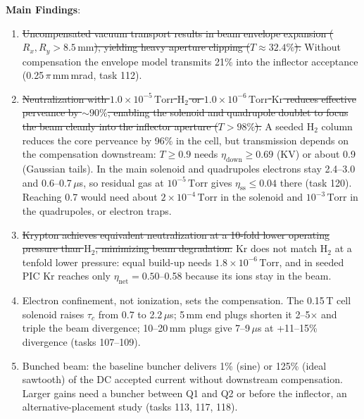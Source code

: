 \documentclass[11pt,a4paper]{article}
\newcommand{\old}[1]{\textcolor{red!70!black}{\sout{#1}}}
\newcommand{\new}[1]{\textcolor{blue!60!black}{#1}}
\begin{document}
\textbf{Main Findings}:
\begin{enumerate}
    \item \old{Uncompensated vacuum transport results in beam envelope expansion ($R_x, R_y > 8.5\,\text{mm}$), yielding heavy aperture clipping ($T \approx 32.4\%$).} \new{Without compensation the envelope model transmits 21\% into the inflector acceptance (0.25\,$\pi$\,mm\,mrad, task 112).}
    \item \old{Neutralization with $1.0 \times 10^{-5}\,\text{Torr}$ $\text{H}_2$ or $1.0 \times 10^{-6}\,\text{Torr}$ $\text{Kr}$ reduces effective perveance by $\sim 90\%$, enabling the solenoid and quadrupole doublet to focus the beam cleanly into the inflector aperture ($T > 98\%$).} \new{A seeded $\text{H}_2$ column reduces the core perveance by 96\% in the cell, but transmission depends on the compensation downstream: $T \ge 0.9$ needs $\eta_{\text{down}} \ge 0.69$ (KV) or about 0.9 (Gaussian tails). In the main solenoid and quadrupoles electrons stay 2.4--3.0 and 0.6--0.7\,$\mu$s, so residual gas at $10^{-5}\,\text{Torr}$ gives $\eta_{\text{ss}} \le 0.04$ there (task 120). Reaching 0.7 would need about $2\times10^{-4}\,\text{Torr}$ in the solenoid and $10^{-3}\,\text{Torr}$ in the quadrupoles, or electron traps.}
    \item \old{Krypton achieves equivalent neutralization at a 10-fold lower operating pressure than $\text{H}_2$, minimizing beam degradation.} \new{Kr does not match $\text{H}_2$ at a tenfold lower pressure: equal build-up needs $1.8\times10^{-6}\,\text{Torr}$, and in seeded PIC Kr reaches only $\eta_{\text{net}} = 0.50$--0.58 because its ions stay in the beam.}
    \item \new{Electron confinement, not ionization, sets the compensation. The 0.15\,T cell solenoid raises $\tau_c$ from 0.7 to 2.2\,$\mu$s; 5\,mm end plugs shorten it 2--5$\times$ and triple the beam divergence; 10--20\,mm plugs give 7--9\,$\mu$s at +11--15\% divergence (tasks 107--109).}
    \item \new{Bunched beam: the baseline buncher delivers 1\% (sine) or 125\% (ideal sawtooth) of the DC accepted current without downstream compensation. Larger gains need a buncher between Q1 and Q2 or before the inflector, an alternative-placement study (tasks 113, 117, 118).}
\end{enumerate}
\end{document}
